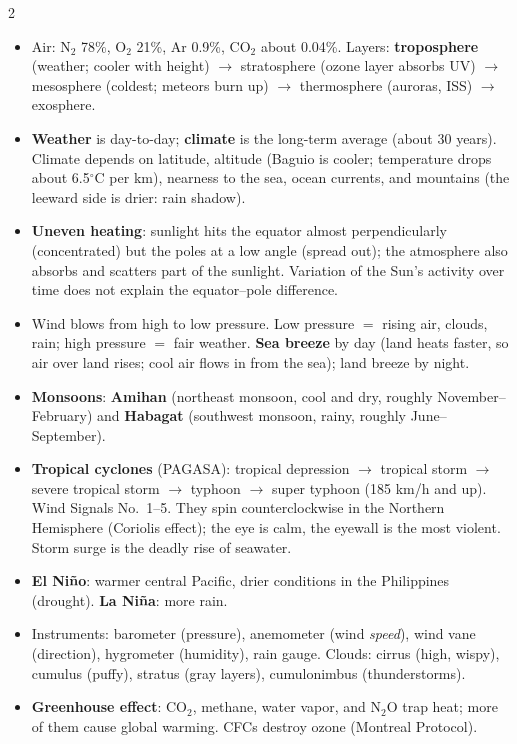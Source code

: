 \documentclass[10pt]{article}
\makeatletter
\newcommand{\sub}[1]{\par\vspace{2.5pt}{\sffamily\bfseries\color{dblue}#1}\par\nobreak\vspace{0.5pt}\@afterheading}
\newcommand{\term}[1]{\textbf{\color{dnavy}#1}}
\makeatother
\begin{document}
\begin{multicols}{2}
\sub{F. Atmosphere, weather, and climate}
\begin{itemize}
\item Air: N$_2$ 78\%, O$_2$ 21\%, Ar 0.9\%, CO$_2$ about 0.04\%. Layers: \textbf{troposphere} (weather; cooler with height) $\to$ stratosphere (ozone layer absorbs UV) $\to$ mesosphere (coldest; meteors burn up) $\to$ thermosphere (auroras, ISS) $\to$ exosphere.
\item \term{Weather} is day-to-day; \term{climate} is the long-term average (about 30 years). Climate depends on latitude, altitude (Baguio is cooler; temperature drops about 6.5$^\circ$C per km), nearness to the sea, ocean currents, and mountains (the leeward side is drier: rain shadow).
\item \term{Uneven heating}: sunlight hits the equator almost perpendicularly (concentrated) but the poles at a low angle (spread out); the atmosphere also absorbs and scatters part of the sunlight. Variation of the Sun's activity over time does not explain the equator--pole difference.
\item Wind blows from high to low pressure. Low pressure $=$ rising air, clouds, rain; high pressure $=$ fair weather. \term{Sea breeze} by day (land heats faster, so air over land rises; cool air flows in from the sea); land breeze by night.
\item \term{Monsoons}: \textbf{Amihan} (northeast monsoon, cool and dry, roughly November--February) and \textbf{Habagat} (southwest monsoon, rainy, roughly June--September).
\item \term{Tropical cyclones} (PAGASA): tropical depression $\to$ tropical storm $\to$ severe tropical storm $\to$ typhoon $\to$ super typhoon (185 km/h and up). Wind Signals No.\ 1--5. They spin counterclockwise in the Northern Hemisphere (Coriolis effect); the eye is calm, the eyewall is the most violent. Storm surge is the deadly rise of seawater.
\item \term{El Ni\~no}: warmer central Pacific, drier conditions in the Philippines (drought). \term{La Ni\~na}: more rain.
\item Instruments: barometer (pressure), anemometer (wind \emph{speed}), wind vane (direction), hygrometer (humidity), rain gauge. Clouds: cirrus (high, wispy), cumulus (puffy), stratus (gray layers), cumulonimbus (thunderstorms).
\item \term{Greenhouse effect}: CO$_2$, methane, water vapor, and N$_2$O trap heat; more of them cause global warming. CFCs destroy ozone (Montreal Protocol).
\end{itemize}


\end{multicols}
\end{document}
